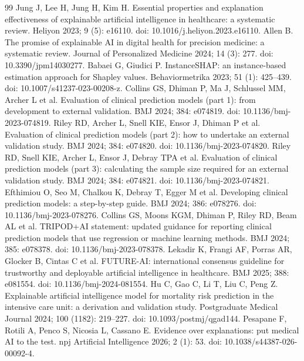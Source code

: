 \documentclass{elektr}
\begin{document}
\begin{thebibliography}{99}
 Jung J, Lee H, Jung H, Kim H. Essential properties and explanation effectiveness of explainable artificial intelligence in healthcare: a systematic review. Heliyon 2023; 9 (5): e16110. doi: 10.1016/j.heliyon.2023.e16110.
 Allen B. The promise of explainable AI in digital health for precision medicine: a systematic review. Journal of Personalized Medicine 2024; 14 (3): 277. doi: 10.3390/jpm14030277.
 Babaei G, Giudici P. InstanceSHAP: an instance-based estimation approach for Shapley values. Behaviormetrika 2023; 51 (1): 425--439. doi: 10.1007/s41237-023-00208-z.
 Collins GS, Dhiman P, Ma J, Schlussel MM, Archer L et al. Evaluation of clinical prediction models (part 1): from development to external validation. BMJ 2024; 384: e074819. doi: 10.1136/bmj-2023-074819.
 Riley RD, Archer L, Snell KIE, Ensor J, Dhiman P et al. Evaluation of clinical prediction models (part 2): how to undertake an external validation study. BMJ 2024; 384: e074820. doi: 10.1136/bmj-2023-074820.
 Riley RD, Snell KIE, Archer L, Ensor J, Debray TPA et al. Evaluation of clinical prediction models (part 3): calculating the sample size required for an external validation study. BMJ 2024; 384: e074821. doi: 10.1136/bmj-2023-074821.
 Efthimiou O, Seo M, Chalkou K, Debray T, Egger M et al. Developing clinical prediction models: a step-by-step guide. BMJ 2024; 386: e078276. doi: 10.1136/bmj-2023-078276.
 Collins GS, Moons KGM, Dhiman P, Riley RD, Beam AL et al. TRIPOD+AI statement: updated guidance for reporting clinical prediction models that use regression or machine learning methods. BMJ 2024; 385: e078378. doi: 10.1136/bmj-2023-078378.
 Lekadir K, Frangi AF, Porras AR, Glocker B, Cintas C et al. FUTURE-AI: international consensus guideline for trustworthy and deployable artificial intelligence in healthcare. BMJ 2025; 388: e081554. doi: 10.1136/bmj-2024-081554.
 Hu C, Gao C, Li T, Liu C, Peng Z. Explainable artificial intelligence model for mortality risk prediction in the intensive care unit: a derivation and validation study. Postgraduate Medical Journal 2024; 100 (1182): 219--227. doi: 10.1093/postmj/qgad144.
 Pesapane F, Rotili A, Penco S, Nicosia L, Cassano E. Evidence over explanations: put medical AI to the test. npj Artificial Intelligence 2026; 2 (1): 53. doi: 10.1038/s44387-026-00092-4.
\end{thebibliography}
\end{document}
